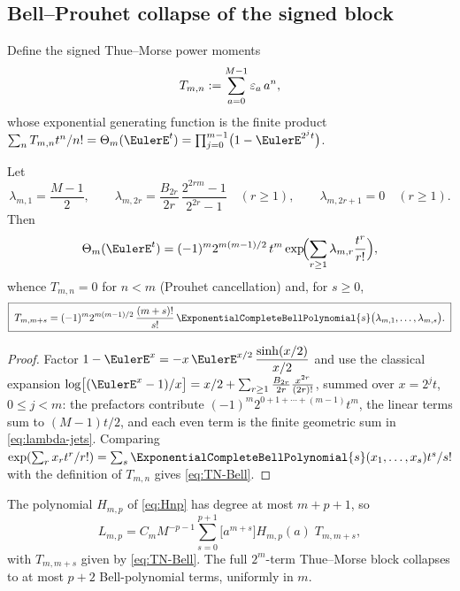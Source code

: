 \subsection{Bell--Prouhet collapse of the signed block}

Define the signed Thue--Morse power moments
\begin{equation}
 T_{m,n}:=\sum_{a=0}^{M-1}\varepsilon_a\,a^{n},
 \label{eq:TNm}
\end{equation}
whose exponential generating function is the finite product
$\sum_{n}T_{m,n}t^{n}/n!=\ThetaTM_m(\EulerE^{t})
=\prod_{j=0}^{m-1}\bigl(1-\EulerE^{2^{j}t}\bigr)$.

\begin{theorem}
\label{thm:Bell-Prouhet}
Let
\begin{equation}
 \lambda_{m,1}=\frac{M-1}{2},
 \qquad
 \lambda_{m,2r}=\frac{B_{2r}}{2r}\,
 \frac{2^{2rm}-1}{2^{2r}-1}
 \quad(r\ge1),
 \qquad
 \lambda_{m,2r+1}=0\quad(r\ge1).
 \label{eq:lambda-jets}
\end{equation}
Then
\begin{equation}
 \ThetaTM_m(\EulerE^{t})
 =(-1)^{m}2^{m(m-1)/2}\,t^{m}
 \exp\!\Bigl(\sum_{r\ge1}\lambda_{m,r}\frac{t^{r}}{r!}\Bigr),
 \label{eq:theta-Bell-egf}
\end{equation}
whence $T_{m,n}=0$ for $n<m$ (Prouhet cancellation) and, for
$s\ge0$,
\begin{equation}
 \boxed{\;
 T_{m,m+s}=(-1)^{m}2^{m(m-1)/2}\,
 \frac{(m+s)!}{s!}\,
 \ExponentialCompleteBellPolynomial{s}\bigl(\lambda_{m,1},\dots,\lambda_{m,s}\bigr).
 \;}
 \label{eq:TN-Bell}
\end{equation}
\end{theorem}

\begin{proof}
Factor $1-\EulerE^{x}=-x\,\EulerE^{x/2}\,\dfrac{\sinh(x/2)}{x/2}$ and use the
classical expansion
$\log\bigl[(\EulerE^{x}-1)/x\bigr]
=x/2+\sum_{r\ge1}\frac{B_{2r}}{2r}\frac{x^{2r}}{(2r)!}$,
summed over $x=2^{j}t$, $0\le j<m$: the prefactors contribute
$(-1)^{m}2^{0+1+\cdots+(m-1)}t^{m}$, the linear terms sum to
$(M-1)t/2$, and each even term is the finite geometric sum in
\eqref{eq:lambda-jets}.  Comparing
$\exp(\sum_r x_rt^r/r!)=\sum_s\ExponentialCompleteBellPolynomial{s}(x_1,\dots,x_s)t^{s}/s!$ with the
definition of $T_{m,n}$ gives \eqref{eq:TN-Bell}.
\end{proof}

\begin{corollary}
\label{cor:pplus2}
The polynomial $H_{m,p}$ of \eqref{eq:Hnp} has degree at most
$m+p+1$, so
\begin{equation}
 \boxed{\;
 L_{m,p}=C_mM^{-p-1}
 \sum_{s=0}^{p+1}\bigl[a^{m+s}\bigr]H_{m,p}(a)\;T_{m,m+s},
 \;}
 \label{eq:Bell-collapse}
\end{equation}
with $T_{m,m+s}$ given by \eqref{eq:TN-Bell}.  The full
$2^{m}$-term Thue--Morse block collapses to at most $p+2$
Bell-polynomial terms, uniformly in $m$.
\end{corollary}

